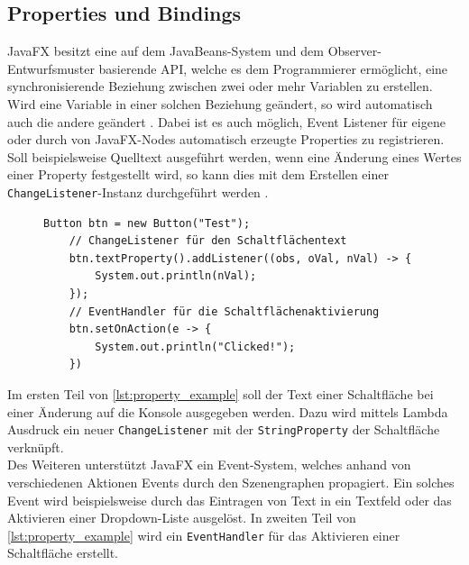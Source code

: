 \subsection{Properties und Bindings}
\label{properties_und_bindings}
JavaFX besitzt eine auf dem JavaBeans-System und dem Observer-Entwurfsmuster basierende API, welche es dem Programmierer ermöglicht, eine synchronisierende Beziehung zwischen zwei oder mehr Variablen zu erstellen. Wird eine Variable in einer solchen Beziehung geändert, so wird automatisch auch die andere geändert \cite{Hommel2013}. Dabei ist es auch möglich, Event Listener für eigene oder durch von JavaFX-Nodes automatisch erzeugte Properties zu registrieren. Soll beispielsweise Quelltext ausgeführt werden, wenn eine Änderung eines Wertes einer Property festgestellt wird, so kann dies mit dem Erstellen einer \texttt{ChangeListener}-Instanz durchgeführt werden \cite{Gao2019}. 
\begin{figure}
	\begin{lstlisting}[caption=Beispiel -- ChangeListener \& EventHandler., captionpos=b, label=lst:property_example]
	Button btn = new Button("Test");
	// ChangeListener für den Schaltflächentext
	btn.textProperty().addListener((obs, oVal, nVal) -> {
		System.out.println(nVal);
	});	
	// EventHandler für die Schaltflächenaktivierung
	btn.setOnAction(e -> {
		System.out.println("Clicked!");
	})
	\end{lstlisting}
\end{figure}
\noindent Im ersten Teil von \autoref{lst:property_example} soll der Text einer Schaltfläche bei einer Änderung auf die Konsole ausgegeben werden. Dazu wird mittels Lambda Ausdruck ein neuer \texttt{ChangeListener} mit der \texttt{StringProperty} der Schaltfläche verknüpft.\\
Des Weiteren unterstützt JavaFX ein Event-System, welches anhand von verschiedenen Aktionen Events durch den Szenengraphen propagiert. Ein solches Event wird beispielsweise durch das Eintragen von Text in ein Textfeld oder das Aktivieren einer Dropdown-Liste ausgelöst. In zweiten Teil von \autoref{lst:property_example} wird ein \texttt{EventHandler} für das Aktivieren einer Schaltfläche erstellt.

